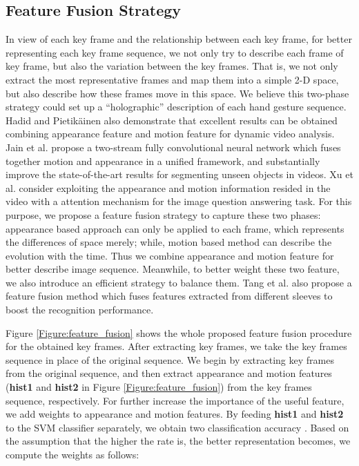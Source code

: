 \documentclass[5p]{elsarticle}
\begin{document}
\subsection{Feature Fusion Strategy}
In view of each key frame and the relationship between each key frame, for better representing each key frame sequence, we not only try to describe each frame of key frame, but also the variation between the key frames.
That is, we not only extract the most representative frames and map them into a simple 2-D space, but also describe how these frames move in this space.
We believe this two-phase strategy could set up a ``holographic'' description of each hand gesture sequence.
Hadid and Pietik{\"a}inen \cite{hadid2009combining} also demonstrate that excellent results can be obtained combining appearance feature and motion feature for dynamic video analysis.
Jain et al. \cite{jain2017fusionseg} propose a two-stream fully convolutional neural network which fuses together motion and appearance in a
unified framework, and substantially improve the state-of-the-art results for segmenting unseen objects in videos.
Xu et al. \cite{xu2017video}  consider exploiting the appearance and motion information resided in the video with a attention
mechanism for the image question answering task.
For this purpose, we propose a feature fusion strategy to capture these two phases: appearance based approach can only be applied to each frame, which represents the differences of space merely; while, motion based method can describe the evolution with the time.
Thus we combine appearance and motion feature for better describe image sequence.
Meanwhile, to better weight these two feature, we also introduce an efficient strategy to balance them.
Tang et al.  \cite{tang2018gesturegan} also propose a feature fusion method which fuses features extracted from different sleeves to boost the recognition performance.

Figure \ref{Figure:feature_fusion} shows the whole proposed feature fusion procedure for the obtained key frames.
After extracting key frames, we take the key frames sequence in place of the original sequence.
We begin by extracting key frames from the original sequence, and then extract appearance and motion features (\textbf{hist1} and \textbf{hist2} in Figure \ref{Figure:feature_fusion}) from the key frames sequence, respectively.
For further increase the importance of the useful feature, we add weights to appearance and motion features.
By feeding \textbf{hist1} and \textbf{hist2} to the SVM classifier separately, we obtain two classification accuracy .
Based on the assumption that the higher the rate is, the better representation becomes, we compute the weights as follows:
\end{document}
